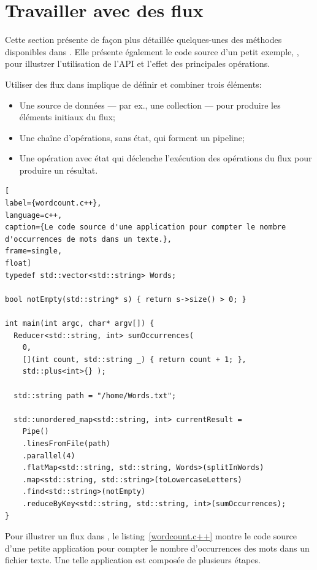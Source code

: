 \section{Travailler avec des flux}

Cette section pr\'esente de fa\c{c}on plus d\'etaill\'ee quelques-unes des m\'ethodes disponibles dans \PpFf. Elle pr\'esente \'egalement le code source d'un petit exemple, , pour illustrer l'utilisation de l'API et l'effet des principales op\'erations. 

Utiliser des flux dans \PpFf{} implique de d\'efinir et combiner trois \'el\'ements: 
\begin{itemize}
	\item Une source de donn\'ees --- par ex., une collection --- pour produire les \'el\'ements initiaux du flux;

	\item Une cha\^ine d'op\'erations, sans \'etat, qui forment un pipeline;

	\item Une op\'eration avec \'etat qui d\'eclenche l'ex\'ecution des op\'erations du flux pour produire un r\'esultat.
\end{itemize}


\begin{lstlisting}[
label={wordcount.c++},
language=c++,
caption={Le code source d'une application pour compter le nombre d'occurrences de mots dans un texte.},
frame=single,
float]
typedef std::vector<std::string> Words;

bool notEmpty(std::string* s) { return s->size() > 0; }

int main(int argc, char* argv[]) {
  Reducer<std::string, int> sumOccurrences(
    0, 
    [](int count, std::string _) { return count + 1; },
    std::plus<int>{} );

  std::string path = "/home/Words.txt"; 

  std::unordered_map<std::string, int> currentResult = 
	Pipe()
    .linesFromFile(path) 
    .parallel(4)
    .flatMap<std::string, std::string, Words>(splitInWords)
    .map<std::string, std::string>(toLowercaseLetters)
    .find<std::string>(notEmpty)
    .reduceByKey<std::string, std::string, int>(sumOccurrences);
}
\end{lstlisting}




Pour illustrer un flux dans \PpFf, le listing~\ref{wordcount.c++} montre le code source d'une petite application pour compter le nombre d'occurrences des mots dans un fichier texte. Une telle application est compos\'ee de plusieurs \'etapes. 

